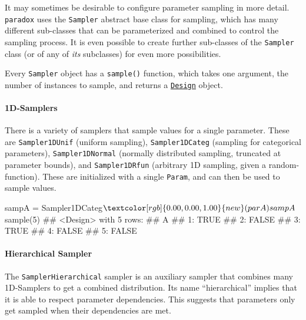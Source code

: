 \documentclass[12pt,]{scrbook}
\newenvironment{Shaded}{}{}
\newcommand{\DecValTok}[1]{#1}
\newcommand{\KeywordTok}[1]{\textcolor[rgb]{0.00,0.00,1.00}{#1}}
\newcommand{\NormalTok}[1]{#1}
\newcommand{\OperatorTok}[1]{#1}
\newcommand{\StringTok}[1]{\textcolor[rgb]{0.00,0.50,0.50}{#1}}
\let\oldparagraph\paragraph
\renewcommand{\paragraph}[1]{\oldparagraph{#1}\mbox{}}
\begin{document}
It may sometimes be desirable to configure parameter sampling in more detail.
\texttt{paradox} uses the \texttt{Sampler} abstract base class for sampling, which has many different sub-classes that can be parameterized and combined to control the sampling process.
It is even possible to create further sub-classes of the \texttt{Sampler} class (or of any of \emph{its} subclasses) for even more possibilities.

Every \texttt{Sampler} object has a \texttt{sample()} function, which takes one argument, the number of instances to sample, and returns a \protect\hyperlink{parameter-designs}{\texttt{Design}} object.

\hypertarget{d-samplers}{%
\paragraph{1D-Samplers}\label{d-samplers}}

There is a variety of samplers that sample values for a single parameter.
These are \texttt{Sampler1DUnif} (uniform sampling), \texttt{Sampler1DCateg} (sampling for categorical parameters), \texttt{Sampler1DNormal} (normally distributed sampling, truncated at parameter bounds), and \texttt{Sampler1DRfun} (arbitrary 1D sampling, given a random-function).
These are initialized with a single \texttt{Param}, and can then be used to sample values.

\begin{Shaded}
\begin{Highlighting}[]
\NormalTok{sampA =}\StringTok{ }\NormalTok{Sampler1DCateg}\OperatorTok{$}\KeywordTok{new}\NormalTok{(parA)}
\NormalTok{sampA}\OperatorTok{$}\KeywordTok{sample}\NormalTok{(}\DecValTok{5}\NormalTok{)}
\NormalTok{## <Design> with 5 rows:}
\NormalTok{##        A}
\NormalTok{## 1:  TRUE}
\NormalTok{## 2: FALSE}
\NormalTok{## 3:  TRUE}
\NormalTok{## 4: FALSE}
\NormalTok{## 5: FALSE}
\end{Highlighting}
\end{Shaded}

\hypertarget{hierarchical-sampler}{%
\paragraph{Hierarchical Sampler}\label{hierarchical-sampler}}

The \texttt{SamplerHierarchical} sampler is an auxiliary sampler that combines many 1D-Samplers to get a combined distribution.
Its name ``hierarchical'' implies that it is able to respect parameter dependencies.
This suggests that parameters only get sampled when their dependencies are met.
\end{document}
